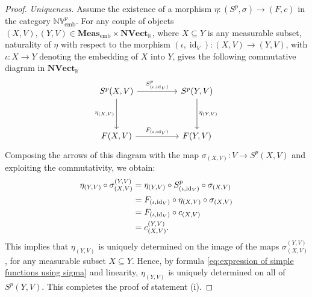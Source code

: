 \documentclass{amsart}
\theoremstyle{definition}
\theoremstyle{plain}
\newcommand{\id}{\operatorname{id}}
\newcommand{\embMeas}{\mathbf{Meas}_\mathrm{emb}}
\newcommand{\NVect}{\mathbf{NVect}_{\mathbb{K}}}
\newcommand{\NVembp}{\mathbb{NV}_{\mathrm{emb}}^p}
\begin{document}
\begin{proof}
            \emph{Uniqueness.}\hspace{.5em} Assume the existence of a morphism $\eta \colon (S^p,\sigma) \rightarrow (F,c)$ in the category $\NVembp$. 
            For any couple of objects $(X,V),(Y,V) \in \embMeas \times \NVect$, where $X \subseteq Y$ is any measurable subset, naturality of $\eta$ with respect to the morphism $(\iota,\id_V) \colon (X,V) \rightarrow (Y,V)$, with $\iota \colon X \rightarrow Y$ denoting the embedding of $X$ into $Y$, gives the following commutative diagram in $\NVect$
            \begin{equation*}
                \begin{tikzcd}
                    S^p(X,V) \ar[rr, "S^p_{(\iota,\id_V)}"] \ar[dd, "\eta_{(X,V)}"']  &   & S^p(Y,V) \ar[dd, "\eta_{(Y,V)}"] \\
                        &   & \\
                    F(X,V) \ar[rr, "F_{(\iota,\id_V)}"]   &   & F(Y,V)
                \end{tikzcd}
            \end{equation*}
            Composing the arrows of this diagram with the map $\sigma_{(X,V)} \colon V \rightarrow S^p(X,V)$ and exploiting the commutativity, we obtain:
            \begin{align}
                \eta_{(Y,V)} \circ \sigma_{(X,V)}^{(Y,V)} &= \eta_{(Y,V)} \circ S^p_{(\iota,\id_V)} \circ \sigma_{(X,V)} \notag \\
                &= F_{(\iota,\id_V)} \circ \eta_{(X,V)} \circ \sigma_{(X,V)} \notag \\
                &= F_{(\iota,\id_V)} \circ c_{(X,V)} \label{eq:apply the definition of morphism in NVembp} \\
                &= c_{(X,V)}^{(Y,V)}. \notag
            \end{align}
            This implies that $\eta_{(Y,V)}$ is uniquely determined on the image of the maps $\sigma_{(X,V)}^{(Y,V)}$, for any measurable subset $X \subseteq Y$. 
            Hence, by formula \eqref{eq:expression of simple functions using sigma} and linearity, $\eta_{(Y,V)}$ is uniquely determined on all of $S^p(Y,V)$. 
            This completes the proof of statement (i).


\end{proof}
\end{document}
